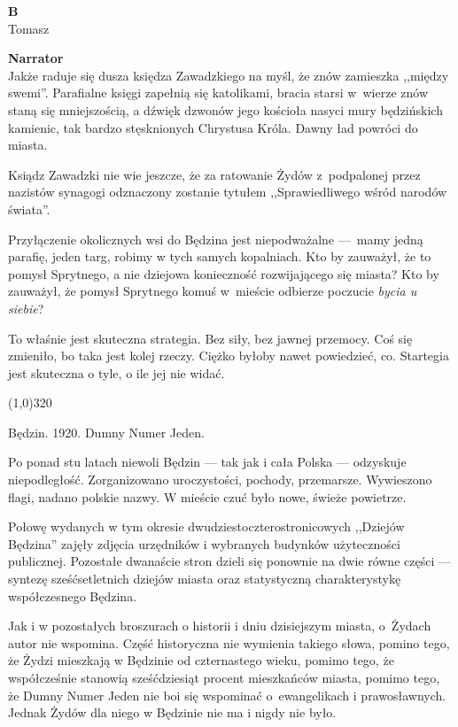 \documentclass[11pt,a4paper,oneside]{article}
\begin{document}
\textbf{B}\\
Tomasz


\textbf{Narrator}\\
Jakże raduje się dusza księdza Zawadzkiego na myśl, że znów zamieszka
,,między swemi''.  Parafialne księgi zapełnią się katolikami, bracia
starsi w~wierze znów staną się mniejszością, a dźwięk dzwonów jego
kościoła nasyci mury będzińskich kamienic, tak bardzo stęsknionych
Chrystusa Króla. Dawny ład powróci do miasta. %

Ksiądz Zawadzki nie wie jeszcze, że za ratowanie Żydów z~podpalonej
przez nazistów synagogi odznaczony zostanie tytułem ,,Sprawiedliwego
wśród narodów świata''.

Przyłączenie okolicznych wsi do Będzina jest niepodważalne \mbox{---}~mamy
jedną parafię, jeden targ, robimy w  tych samych kopalniach. Kto by
zauważył, że to pomysł Sprytnego, a nie dziejowa konieczność
rozwijającego się miasta?  Kto by zauważył, że pomysł Sprytnego komuś
w~mieście odbierze poczucie \emph{bycia u siebie}?

To właśnie jest skuteczna strategia. Bez siły, bez jawnej przemocy.
Coś się zmieniło, bo taka jest kolej rzeczy.  Ciężko byłoby nawet
powiedzieć, co. Startegia jest skuteczna o tyle, o ile jej nie widać. 

\line(1,0){320}

Będzin. 1920. Dumny Numer Jeden.

Po ponad stu latach niewoli Będzin --- tak jak i cała Polska ---
odzyskuje niepodległość. Zorganizowano uroczystości, pochody,
przemarsze. Wywieszono flagi, nadano polskie nazwy. W mieście czuć
było nowe, świeże powietrze.

Połowę wydanych w tym okresie dwudziestoczterostronicowych ,,Dziejów
Będzina'' zajęły zdjęcia urzędników i wybranych budynków użyteczności
publicznej. Pozostałe dwanaście stron dzieli się ponownie na dwie
równe części --- syntezę sześćsetletnich dziejów miasta oraz
statystyczną charakterystykę współczesnego Będzina. 

Jak i w pozostałych broszurach o historii i dniu dzisiejszym miasta,
o~Żydach autor nie wspomina. Część historyczna nie wymienia takiego
słowa, pomino tego, że Żydzi mieszkają w Będzinie od czternastego
wieku, pomimo tego, że współcześnie stanowią sześćdziesiąt procent
mieszkańców miasta, pomimo tego, że Dumny Numer Jeden nie boi się
wspominać o~ewangelikach i prawosławnych. Jednak Żydów dla niego w
Będzinie nie ma i nigdy nie było.
\end{document}

